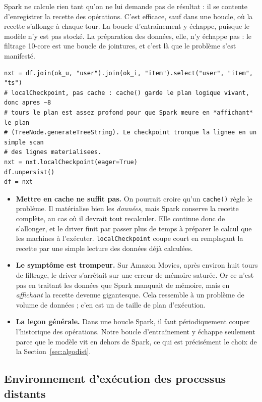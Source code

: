 \documentclass[11pt,a4paper]{article}
\begin{document}
Spark ne calcule rien tant qu'on ne lui demande pas de résultat : il se contente
d'enregistrer la recette des opérations. C'est efficace, sauf dans une boucle, où la
recette s'allonge à chaque tour. La boucle d'entraînement y échappe, puisque le modèle
n'y est pas stocké. La préparation des données, elle, n'y échappe pas : le filtrage
10-core est une boucle de jointures, et c'est là que le problème s'est manifesté.

\begin{lstlisting}[caption={\texttt{data.kcore} - la ligne qui permet à une boucle de
jointures Spark de survivre.},label={lst:kcore}]
nxt = df.join(ok_u, "user").join(ok_i, "item").select("user", "item", "ts")
# localCheckpoint, pas cache : cache() garde le plan logique vivant, donc apres ~8
# tours le plan est assez profond pour que Spark meure en *affichant* le plan
# (TreeNode.generateTreeString). Le checkpoint tronque la lignee en un simple scan
# des lignes materialisees.
nxt = nxt.localCheckpoint(eager=True)
df.unpersist()
df = nxt
\end{lstlisting}

\begin{itemize}\itemsep3pt
\item \textbf{Mettre en cache ne suffit pas.} On pourrait croire qu'un \texttt{cache()}
règle le problème. Il matérialise bien les \emph{données}, mais Spark conserve la
recette complète, au cas où il devrait tout recalculer. Elle continue donc de
s'allonger, et le driver finit par passer plus de temps à préparer le calcul que les
machines à l'exécuter. \texttt{localCheckpoint} coupe court en remplaçant la recette par
une simple lecture des données déjà calculées.
\item \textbf{Le symptôme est trompeur.} Sur Amazon Movies, après environ huit tours de
filtrage, le driver s'arrêtait sur une erreur de mémoire saturée. Or ce n'est pas en
traitant les données que Spark manquait de mémoire, mais en \emph{affichant} la recette
devenue gigantesque. Cela ressemble à un problème de volume de données ; c'en est un de
taille de plan d'exécution.
\item \textbf{La leçon générale.} Dans une boucle Spark, il faut périodiquement couper
l'historique des opérations. Notre boucle d'entraînement y échappe seulement parce que
le modèle vit en dehors de Spark, ce qui est précisément le choix de la
Section~\ref{sec:algodist}.
\end{itemize}

\subsection{Environnement d'exécution des processus distants}
\end{document}
